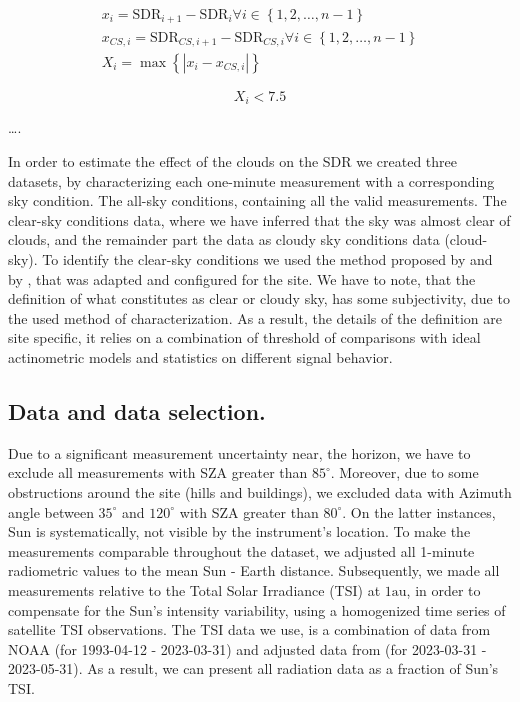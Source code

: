 \documentclass[preprint, 3p,
authoryear]{elsarticle} %
\begin{document}
\begin{gather}
x_i = \text{SDR}_{i+1} - \text{SDR}_{i} \forall i \in \left \{ 1, 2, \ldots, n-1 \right \} \label{eq:VSM1} \\
x_{CS,i} = \text{SDR}_{CS,i+1} - \text{SDR}_{CS,i} \forall i \in \left \{ 1, 2, \ldots, n-1 \right \} \label{eq:VSM2} \\
X_i = \max{\left \{ \left | x_i - x_{CS,i} \right | \right \}} \label{eq:VSM3}
\end{gather}

\begin{equation}
X_i < 7.5
\label{eq:VSMcr}
\end{equation}

\ldots.

In order to estimate the effect of the clouds on the SDR we created
three datasets, by characterizing each one-minute measurement with a
corresponding sky condition. The all-sky conditions, containing all the
valid measurements. The clear-sky conditions data, where we have
inferred that the sky was almost clear of clouds, and the remainder part
the data as cloudy sky conditions data (cloud-sky). To identify the
clear-sky conditions we used the method proposed by \citet{Long2000} and
by \citet{Reno2016}, that was adapted and configured for the site. We
have to note, that the definition of what constitutes as clear or cloudy
sky, has some subjectivity, due to the used method of characterization.
As a result, the details of the definition are site specific, it relies
on a combination of threshold of comparisons with ideal actinometric
models and statistics on different signal behavior.

\hypertarget{data-and-data-selection.}{%
\subsection{Data and data selection.}\label{data-and-data-selection.}}

Due to a significant measurement uncertainty near, the horizon, we have
to exclude all measurements with SZA greater than \(85^\circ\).
Moreover, due to some obstructions around the site (hills and
buildings), we excluded data with Azimuth angle between \(35^\circ\) and
\(120^\circ\) with SZA greater than \(80^\circ\). On the latter
instances, Sun is systematically, not visible by the instrument's
location. To make the measurements comparable throughout the dataset, we
adjusted all 1-minute radiometric values to the mean Sun - Earth
distance. Subsequently, we made all measurements relative to the Total
Solar Irradiance (TSI) at \(1 \text{au}\), in order to compensate for
the Sun's intensity variability, using a homogenized time series of
satellite TSI observations. The TSI data we use, is a combination of
data from NOAA \citep{Coddington2005} (for 1993-04-12 - 2023-03-31) and
adjusted data from \citet{LASP2023} (for 2023-03-31 - 2023-05-31). As a
result, we can present all radiation data as a fraction of Sun's TSI.
\end{document}
